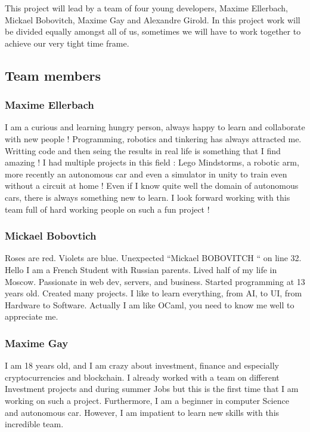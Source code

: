 \documentclass[12pt]{article}
\begin{document}
This project will lead by a team of four young developers, Maxime Ellerbach, Mickael Bobovitch, Maxime Gay and Alexandre Girold. In this project work will be divided equally amongst all of us, sometimes we will have to work together to achieve our very tight time frame. 

\subsection{Team members}

\subsubsection{Maxime Ellerbach}
I am a curious and learning hungry person, always happy to learn and collaborate with new people ! Programming, robotics and tinkering has always attracted me. Writting code and then seing the results in real life is something that I find amazing ! I had multiple projects in this field : Lego Mindstorms, a robotic arm, more recently an autonomous car and even a simulator in unity to train even without a circuit at home ! Even if I know quite well the domain of autonomous cars, there is always something new to learn. I look forward working with this team full of hard working people  on such a fun project !

\subsubsection{Mickael Bobovtich}
Roses are red. Violets are blue. Unexpected “Mickael BOBOVITCH “ on line 32. Hello I am a French Student with Russian parents. Lived half of my life in Moscow. Passionate in web dev, servers, and business. Started programming at 13 years old. Created many projects. I like to learn everything, from AI, to UI, from Hardware to Software. Actually I am like OCaml, you need to know me well to appreciate me.

\subsubsection{Maxime Gay}
I am 18 years old,  and I am crazy about investment, finance and especially cryptocurrencies and blockchain. I already worked with a team on different Investment projects and during summer Jobs but this is the first time that I am working on such a  project. Furthermore, I am a beginner in computer Science and autonomous car. However, I am impatient to learn new skills with this incredible team. 
\end{document}
